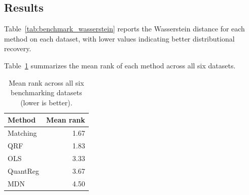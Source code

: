 \subsection{Results}

Table~\ref{tab:benchmark_wasserstein} reports the Wasserstein distance for each method on each dataset, with lower values indicating better distributional recovery.

\begin{table}[H]
    \centering
    \caption{Wasserstein distance by method and dataset. Bold values indicate the best-performing method for each dataset.}
    \label{tab:benchmark_wasserstein}
\end{table}

Table~\ref{tab:benchmark_ranks} summarizes the mean rank of each method across all six datasets.

\begin{table}[H]
    \centering
    \caption{Mean rank across all six benchmarking datasets (lower is better).}
    \label{tab:benchmark_ranks}
    \begin{tabular}{lr}
        \toprule
        Method & Mean rank \\
        \midrule
        Matching & 1.67 \\
        QRF & 1.83 \\
        OLS & 3.33 \\
        QuantReg & 3.67 \\
        MDN & 4.50 \\
        \bottomrule
    \end{tabular}
\end{table}


